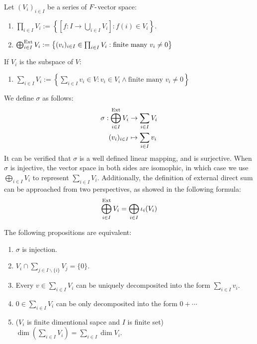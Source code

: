 \begin{definition}
    Let $(V_i)_{i \in I}$ be a series of $F \mbox{-}$vector space:
    \begin{enumerate}
        \item $\prod_{i \in I} V_i := \left\{ \left[f: I \to \bigcup_{i \in I} V_i\right]: f(i) \in V_i \right\}$.
        \item $\bigoplus^{\mathrm{Ext}}_{i \in I} V_i := \left\{ (v_i)_{i\in I} \in \prod_{i \in I} V_i : \text{finite many } v_i \neq 0 \right\}$
    \end{enumerate}
    If $V_i$ is the subspace of $V$:
    \begin{enumerate}
        \item $\sum_{i \in I} V_i := \left\{ \sum_{i \in I} v_i \in V: v_i \in V_i \land \text{finite many } v_i \neq 0 \right\}$
    \end{enumerate}
\end{definition}


We define $\sigma$ as follows:
\begin{align*}
    \sigma: \bigoplus^{\mathrm{Ext}}_{i \in I} V_i & \to \sum_{i \in I} V_i \\
    (v_i)_{i \in I} & \mapsto \sum_{i \in I} v_i
\end{align*}
It can be verified that $\sigma$ is a well defined linear mapping, and is surjective. When $\sigma$ is injective, the vector space in both sides are isomophic, in which case we use $\bigoplus_{i \in I} V_i$ to represent $\sum_{i \in I} V_i$. Additionally, the definition of external direct sum can be approached from two perspectives, as showed in the following formula:
\[
    \bigoplus^{\mathrm{Ext}}_{i \in I} V_i = \bigoplus_{i \in I} \iota_i (V_i)
\]






\begin{proposition}
    The following propositions are equivalent:
    \begin{enumerate}
        \item $\sigma$ is injection.
        \item $V_i \cap \sum_{j \in I \smallsetminus \{i\}} V_j = \{ 0 \}$.
        \item Every $v \in \sum_{i \in I} V_i$ can be uniquely decomposited into the form $\sum_{i \in I} v_i$.
        \item $0 \in \sum_{i \in I} V_i$ can be only decomposited into the form $0 + \cdots$
        \item ($V_i$ is finite dimentional sapce and $I$ is finite set) $\dim(\sum_{i \in I} V_i) = \sum_{i \in I} \dim V_i$.
    \end{enumerate}
\end{proposition}

